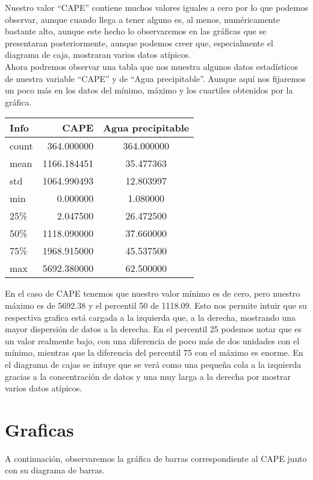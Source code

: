 \documentclass[a4paper,12pt]{article}
\begin{document}
\noindent
Nuestro valor “CAPE” contiene muchos valores iguales a cero por lo que podemos observar, aunque cuando llega a tener alguno es, al menos, numéricamente bastante alto, aunque este hecho lo observaremos en las gráficas que se presentaran posteriormente, aunque podemos creer que, especialmente el diagrama de caja, mostraran varios datos atípicos.\\

\noindent
Ahora podremos observar una tabla que nos muestra algunos datos estadísticos de nuestra variable “CAPE” y de “Agua precipitable”. Aunque aquí nos fijaremos un poco más en los datos del mínimo, máximo y los cuartiles obtenidos por la gráfica.

\begin{center}
\begin{tabular}{|l|r|c|}
\hline
Info & CAPE &	Agua precipitable\\ \hline
count &	364.000000 &	364.000000\\ \hline
mean &1166.184451 &	35.477363\\ \hline
std &	1064.990493 &	12.803997\\ \hline
min	& 0.000000 &	1.080000\\ \hline
25\% &	2.047500 &	26.472500\\ \hline
50\% &	1118.090000 &	37.660000\\ \hline
75\% &	1968.915000 &	45.537500\\ \hline
max &	5692.380000 &	62.500000\\ \hline
\end{tabular}
\end{center}

\noindent
En el caso de CAPE tenemos que nuestro valor mínimo es de cero, pero nuestro máximo es de 5692.38 y el percentil 50 de 1118.09. Esto nos permite intuir que su respectiva grafica está cargada a la izquierda que, a la derecha, mostrando una mayor dispersión de datos a la derecha. En el percentil 25 podemos notar que es un valor realmente bajo, con una diferencia de poco más de dos unidades con el mínimo, mientras que la diferencia del percentil 75 con el máximo es enorme. En el diagrama de cajas se intuye que se verá como una pequeña cola a la izquierda gracias a la concentración de datos y una muy larga a la derecha por mostrar varios datos atípicos.

\newpage
\section{Graficas}
\noindent
A continuación, observaremos la gráfica de barras correspondiente al CAPE junto con su diagrama de barras. 
\end{document}
